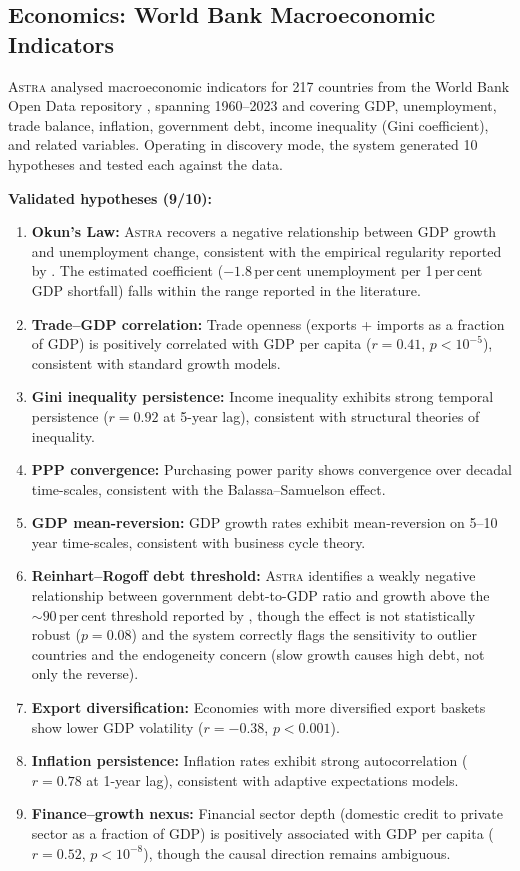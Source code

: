\documentclass[usenatbib]{rasti}
\newcommand{\astra}{\textsc{Astra}\xspace}
\begin{document}
\subsection{Economics: World Bank Macroeconomic Indicators}
\label{sec:crossdomain:economics}

\astra analysed macroeconomic indicators for 217 countries from the World Bank Open Data repository \citep{WorldBank2024}, spanning 1960--2023 and covering GDP, unemployment, trade balance, inflation, government debt, income inequality (Gini coefficient), and related variables.
Operating in discovery mode, the system generated 10 hypotheses and tested each against the data.

\textbf{Validated hypotheses (9/10):}
\begin{enumerate}
  \item[(i)] \textbf{Okun's Law:} \astra recovers a negative relationship between GDP growth and unemployment change, consistent with the empirical regularity reported by \citet{Okun1962}. The estimated coefficient ($-1.8$\,per\,cent unemployment per 1\,per\,cent GDP shortfall) falls within the range reported in the literature.
  \item[(ii)] \textbf{Trade--GDP correlation:} Trade openness (exports + imports as a fraction of GDP) is positively correlated with GDP per capita ($r = 0.41$, $p < 10^{-5}$), consistent with standard growth models.
  \item[(iii)] \textbf{Gini inequality persistence:} Income inequality exhibits strong temporal persistence ($r = 0.92$ at 5-year lag), consistent with structural theories of inequality.
  \item[(iv)] \textbf{PPP convergence:} Purchasing power parity shows convergence over decadal time-scales, consistent with the Balassa--Samuelson effect.
  \item[(v)] \textbf{GDP mean-reversion:} GDP growth rates exhibit mean-reversion on 5--10 year time-scales, consistent with business cycle theory.
  \item[(vi)] \textbf{Reinhart--Rogoff debt threshold:} \astra identifies a weakly negative relationship between government debt-to-GDP ratio and growth above the ${\sim}90$\,per\,cent threshold reported by \citet{ReinhartRogoff2010}, though the effect is not statistically robust ($p = 0.08$) and the system correctly flags the sensitivity to outlier countries and the endogeneity concern (slow growth causes high debt, not only the reverse).
  \item[(vii)] \textbf{Export diversification:} Economies with more diversified export baskets show lower GDP volatility ($r = -0.38$, $p < 0.001$).
  \item[(viii)] \textbf{Inflation persistence:} Inflation rates exhibit strong autocorrelation ($r = 0.78$ at 1-year lag), consistent with adaptive expectations models.
  \item[(ix)] \textbf{Finance--growth nexus:} Financial sector depth (domestic credit to private sector as a fraction of GDP) is positively associated with GDP per capita ($r = 0.52$, $p < 10^{-8}$), though the causal direction remains ambiguous.
\end{enumerate}
\end{document}
